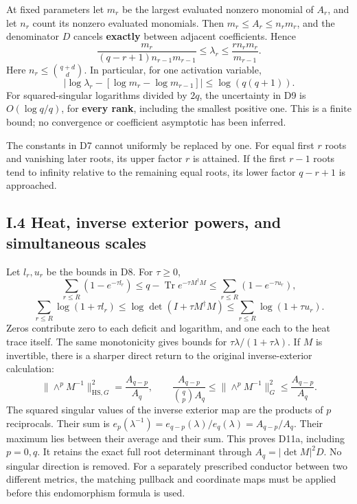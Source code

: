 At fixed parameters let \(m_r\) be the largest evaluated nonzero monomial of \(A_r\), and let \(n_r\) count its nonzero evaluated monomials. Then \(m_r\le A_r\le n_rm_r\), and the denominator \(D\) cancels \textbf{exactly} between adjacent coefficients. Hence \[
 \boxed{\frac{m_r}{(q-r+1)n_{r-1}m_{r-1}}
 \le\lambda_r\le
 \frac{r n_rm_r}{m_{r-1}}.}
 \tag{D8}
\] Here \(n_r\le\binom{q+d}{d}\). In particular, for one activation variable, \[
 \left|\log\lambda_r-[\log m_r-\log m_{r-1}]\right|
 \le\log(q(q+1)).
 \tag{D9}
\] For squared-singular logarithms divided by \(2q\), the uncertainty in D9 is \(O(\log q/q)\), for \textbf{every rank}, including the smallest positive one. This is a finite bound; no convergence or coefficient asymptotic has been inferred.

The constants in D7 cannot uniformly be replaced by one. For equal first \(r\) roots and vanishing later roots, its upper factor \(r\) is attained. If the first \(r-1\) roots tend to infinity relative to the remaining equal roots, its lower factor \(q-r+1\) is approached.

\subsection{I.4 Heat, inverse exterior powers, and simultaneous scales}\label{i.4-heat-inverse-exterior-powers-and-simultaneous-scales}

Let \(l_r,u_r\) be the bounds in D8. For \(\tau\ge0\), \[
 \sum_{r\le R}(1-e^{-\tau l_r})
 \le q-\operatorname{Tr}e^{-\tau M^\dagger M}
 \le\sum_{r\le R}(1-e^{-\tau u_r}),
 \tag{D10}
\] \[
 \sum_{r\le R}\log(1+\tau l_r)
 \le\log\det(I+\tau M^\dagger M)
 \le\sum_{r\le R}\log(1+\tau u_r).
 \tag{D11}
\] Zeros contribute zero to each deficit and logarithm, and one each to the heat trace itself. The same monotonicity gives bounds for \(\tau\lambda/(1+\tau\lambda)\). If \(M\) is invertible, there is a sharper direct return to the original inverse-exterior calculation: \[
 \boxed{\|\wedge^p M^{-1}\|_{\mathrm{HS},G}^{2}
       =\frac{A_{q-p}}{A_q},\qquad
 \frac{A_{q-p}}{\binom qp A_q}
 \le\|\wedge^pM^{-1}\|_G^2
 \le\frac{A_{q-p}}{A_q}.}
 \tag{D11a}
\] The squared singular values of the inverse exterior map are the products of \(p\) reciprocals. Their sum is \(e_p(\lambda^{-1})=e_{q-p}(\lambda)/e_q(\lambda)=A_{q-p}/A_q\). Their maximum lies between their average and their sum. This proves D11a, including \(p=0,q\). It retains the exact full root determinant through \(A_q=|\det M|^2D\). No singular direction is removed. For a separately prescribed conductor between two different metrics, the matching pullback and coordinate maps must be applied before this endomorphism formula is used.

